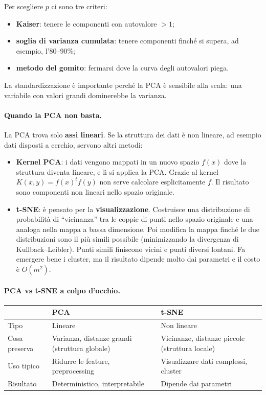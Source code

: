 Per scegliere $p$ ci sono tre criteri:
\begin{itemize}
    \item \textbf{Kaiser}: tenere le componenti con autovalore $> 1$;
    \item \textbf{soglia di varianza cumulata}: tenere componenti finché si supera, ad esempio, l'80--90\%;
    \item \textbf{metodo del gomito}: fermarsi dove la curva degli autovalori piega.
\end{itemize}

La standardizzazione è importante perché la PCA è sensibile alla scala: una variabile con valori grandi dominerebbe la varianza.

\paragraph*{Quando la PCA non basta.}
La PCA trova solo \textbf{assi lineari}. Se la struttura dei dati è non lineare, ad esempio dati disposti a cerchio, servono altri metodi:
\begin{itemize}
    \item \textbf{Kernel PCA}: i dati vengono mappati in un nuovo spazio $f(x)$ dove la struttura diventa lineare, e lì si applica la PCA. Grazie al kernel $K(x,y) = f(x)^t f(y)$ non serve calcolare esplicitamente $f$. Il risultato sono componenti non lineari nello spazio originale.
    \item \textbf{t-SNE}: è pensato per la \textbf{visualizzazione}. Costruisce una distribuzione di probabilità di ``vicinanza'' tra le coppie di punti nello spazio originale e una analoga nella mappa a bassa dimensione. Poi modifica la mappa finché le due distribuzioni sono il più simili possibile (minimizzando la divergenza di Kullback--Leibler). Punti simili finiscono vicini e punti diversi lontani. Fa emergere bene i cluster, ma il risultato dipende molto dai parametri e il costo è $O(m^2)$.
\end{itemize}

\paragraph*{PCA vs t-SNE a colpo d'occhio.}
\begin{center}
    \begin{tabular}{p{}p{}p{}}
        \toprule
        & \textbf{PCA} & \textbf{t-SNE} \\
        \midrule
        Tipo & Lineare & Non lineare \\
        Cosa preserva & Varianza, distanze grandi (struttura globale) & Vicinanze, distanze piccole (struttura locale) \\
        Uso tipico & Ridurre le feature, preprocessing & Visualizzare dati complessi, cluster \\
        Risultato & Deterministico, interpretabile & Dipende dai parametri \\
        \bottomrule
    \end{tabular}
\end{center}

